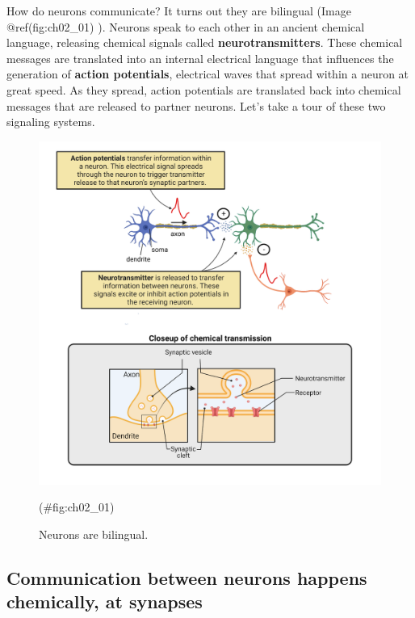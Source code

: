 \documentclass[
]{book}
\begin{document}
How do neurons communicate? It turns out they are bilingual (Image @ref(fig:ch02\_01) ). Neurons speak to each other in an ancient chemical language, releasing chemical signals called \textbf{neurotransmitters}. These chemical messages are translated into an internal electrical language that influences the generation of \textbf{action potentials}, electrical waves that spread within a neuron at great speed. As they spread, action potentials are translated back into chemical messages that are released to partner neurons. Let's take a tour of these two signaling systems.

\begin{figure}

{\centering \includegraphics[width=0.8\linewidth]{images/ch02/02_01} 

}

\caption{Neurons are bilingual.}(\#fig:ch02_01)
\end{figure}

\hypertarget{communication-between-neurons-happens-chemically-at-synapses}{%
\subsection{\texorpdfstring{Communication between neurons happens chemically, at \textbf{synapses}}{Communication between neurons happens chemically, at synapses}}\label{communication-between-neurons-happens-chemically-at-synapses}}
\end{document}
